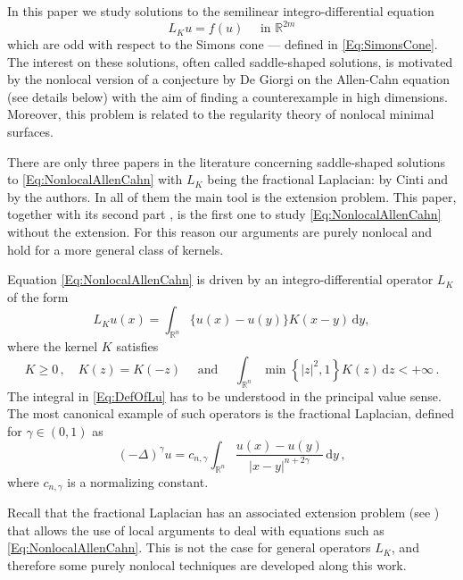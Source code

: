 \documentclass[12pt,reqno]{amsart}
\theoremstyle{definition}
\theoremstyle{remark}
\newcommand{\con}[1]{\mathbb{#1}}
\newcommand{\R}{\con{R}} %
\newcommand{\s}{\gamma}
\newcommand{\fraclaplacian}{(-\Delta)^\s}
\renewcommand{\d}{\,\mathrm{d}} %
\numberwithin{equation}{section}
\begin{document}
	
	In this paper we study solutions to the semilinear integro-differential equation
	\begin{equation}
	\label{Eq:NonlocalAllenCahn}
	L_K u = f(u) \quad \textrm{ in } \R^{2m}
	\end{equation}
	which are odd with respect to the Simons cone --- defined in \eqref{Eq:SimonsCone}. The interest on these solutions, often called saddle-shaped solutions, is motivated by the nonlocal version of a conjecture by De Giorgi on the Allen-Cahn equation (see details below) with the aim of finding a counterexample in high dimensions. Moreover, this problem is related to the regularity theory of nonlocal minimal surfaces.
	
	There are only three papers in the literature concerning saddle-shaped solutions to \eqref{Eq:NonlocalAllenCahn} with $L_K$ being the fractional Laplacian: \cite{Cinti-Saddle, Cinti-Saddle2} by Cinti and \cite{Felipe-Sanz-Perela:SaddleFractional} by the authors. In all of them the main tool is the extension problem. This paper, together with its second part  \cite{FelipeSanz-Perela:IntegroDifferentialII}, is the first one to study \eqref{Eq:NonlocalAllenCahn} without the extension. For this reason our arguments are purely nonlocal and hold for a more general class of kernels.
	
	
	
	Equation \eqref{Eq:NonlocalAllenCahn} is driven by an integro-differential operator $L_K$ of the form
	\begin{equation}
	\label{Eq:DefOfLu}
	L_Ku(x) = \int_{\R^n} \{u(x) - u(y)\} K(x-y)\d y,
	\end{equation}
	where the kernel $K$ satisfies
	\begin{equation}
	\label{Eq:Symmetry&IntegrabilityOfK}
	K\geq 0\,, \quad K(z) = K(-z) \quad \textrm{ and } \quad \int_{\R^n} \min \left\{ |z|^2, 1 \right\} K(z) \d z < + \infty\,.
	\end{equation}
	The integral in \eqref{Eq:DefOfLu} has to be understood in the principal value sense. The most canonical example of such operators is the fractional Laplacian, defined for $\s\in(0,1)$ as
	$$
	\fraclaplacian u = c_{n, \s} \int_{\R^n} \dfrac{u(x) - u(y)}{|x-y|^{n + 2\s}}\d y\,,
	$$
	where $c_{n, \s}$ is a normalizing constant.
	
	Recall that the fractional Laplacian has an associated extension problem (see \cite{CaffarelliSilvestre}) that allows the use of local arguments to deal with equations such as \eqref{Eq:NonlocalAllenCahn}. This is not the case for general operators $L_K$, and therefore some purely nonlocal techniques are developed along this work. 
	
\end{document}
